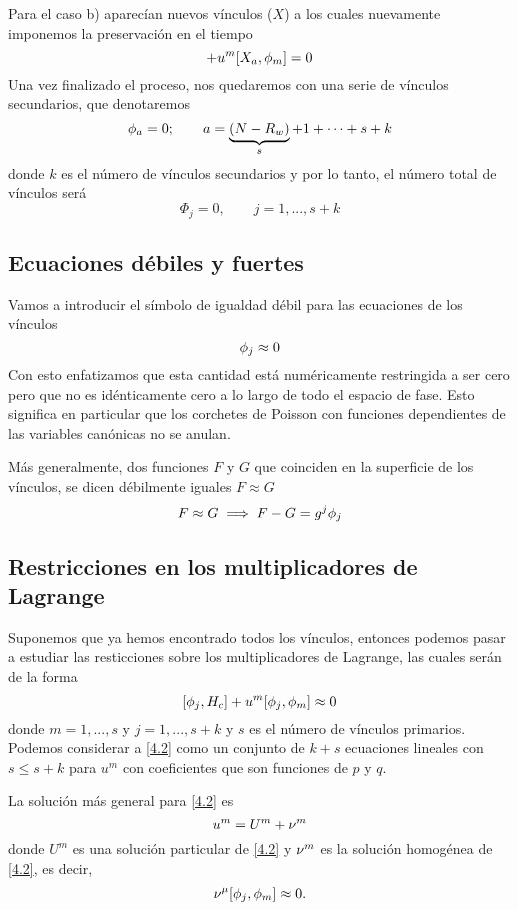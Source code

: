 Para el caso b) aparecían nuevos vínculos ($X$) a los cuales nuevamente imponemos la preservación en el tiempo
\begin{equation}
  [X_a,H_c]+u^m[X_a,\f_m]=0
\end{equation}
Una vez finalizado el proceso, nos quedaremos con una serie de vínculos secundarios, que denotaremos
\begin{equation}
  \phi_a=0;\qquad a=\underbrace{(N-R_w)}_s+1+\cdots + s+k
\end{equation}
donde $k$ es el número de vínculos secundarios y por lo tanto, el número total de vínculos será
\begin{equation}
  \Phi_j=0,\qquad j=1,...,s+k
\end{equation}

\subsection{Ecuaciones débiles y fuertes}
\begin{defi}
Vamos a introducir el símbolo de igualdad débil para las ecuaciones de los vínculos
\begin{equation}
  \phi_j\approx 0
\end{equation}
Con esto enfatizamos que esta cantidad está numéricamente restringida a ser cero pero que no es idénticamente cero a lo largo de todo el espacio de fase. Esto significa en particular que los corchetes de Poisson con funciones dependientes de las variables canónicas no se anulan.

Más generalmente, dos funciones $F$ y $G$ que coinciden en la superficie de los vínculos, se dicen débilmente iguales $F\approx G$
\begin{equation}
  F\approx G\implies F-G=g^j\phi_j
\end{equation}
\end{defi}

\subsection{Restricciones en los multiplicadores de Lagrange}
Suponemos que ya hemos encontrado todos los vínculos, entonces podemos pasar a estudiar las resticciones sobre los multiplicadores de Lagrange, las cuales serán de la forma
\begin{equation}\label{4.2}
  [\phi_j,H_c]+u^m[\phi_j,\phi_m]\approx 0
\end{equation}
donde $m=1,...,s$ y $j=1,...,s+k$ y $s$ es el número de vínculos primarios. Podemos considerar a \eqref{4.2} como un conjunto de $k+s$ ecuaciones lineales con $s\leq s+k$ para $u^m$ con coeficientes que son funciones de $p$ y $q$.

La solución más general para \eqref{4.2} es 
\begin{equation}
  u^m=U^m+\nu^m
\end{equation}
donde $U^m$ es una solución particular de \eqref{4.2} y $\nu^m $ es la solución homogénea de \eqref{4.2}, es decir,
\begin{equation}
  \nu^\mu [\phi_j,\phi_m]\approx 0.
\end{equation}


















